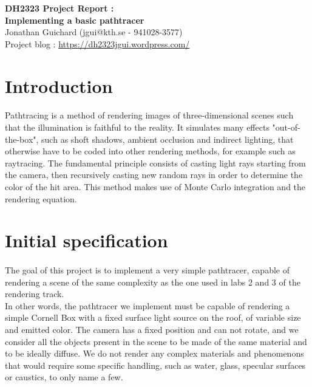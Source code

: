 \documentclass[12pt, oneside]{report}
\begin{document}
\begin{center}
\Large{
\textbf{DH2323 Project Report : \\ Implementing a basic pathtracer}
} 
\medskip
\small{\\Jonathan Guichard (jgui@kth.se - 941028-3577) \\ Project blog : \url{https://dh2323jgui.wordpress.com/}}
\end{center}

\bigskip

\section*{Introduction}

\paragraph{}Pathtracing is a method of rendering images of three-dimensional scenes such that the illumination is faithful to the reality. It simulates many effects "out-of-the-box", such as shoft shadows, ambient occlusion and indirect lighting, that otherwise have to be coded into other rendering methods, for example such as raytracing. The fundamental principle consists of casting light rays starting from the camera, then recursively casting new random rays in order to determine the color of the hit area. This method makes use of Monte Carlo integration and the rendering equation.

\section*{Initial specification}

\paragraph{}The goal of this project is to implement a very simple pathtracer, capable of rendering a scene of the same complexity as the one used in labs 2 and 3 of the rendering track. \\
In other words, the pathtracer we implement must be capable of rendering a simple Cornell Box with a fixed surface light source on the roof, of variable size and emitted color. The camera has a fixed position and can not rotate, and we consider all the objects present in the scene to be made of the same material and to be ideally diffuse. We do not render any complex materials and phenomenons that would require some specific handling, such as water, glass, specular surfaces or caustics, to only name a few. \\
\end{document}
